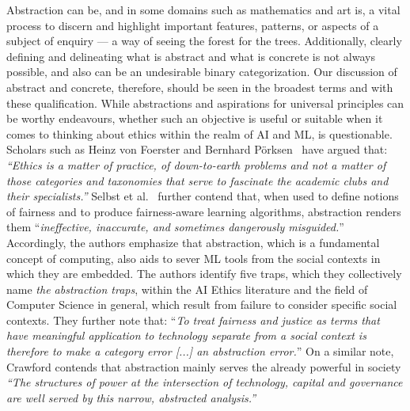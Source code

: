 \documentclass[manuscript]{acmart}
\begin{document}
Abstraction can be, and in some domains such as mathematics and art is, a vital process to discern and highlight important features, patterns, or aspects of a subject of enquiry --- a way of seeing the forest for the trees. Additionally, clearly defining and delineating what is abstract and what is concrete is not always possible, and also  can be an undesirable binary categorization. %
Our discussion of abstract and concrete, therefore, should be seen in the broadest terms and with these qualification. While abstractions and aspirations for universal principles can be worthy endeavours, whether such an objective is useful or suitable when it comes to thinking about ethics within the realm of AI and ML, is questionable. Scholars such as Heinz von Foerster and Bernhard Pörksen~\cite{von2002understanding} have argued that: \textit{``Ethics is a matter of practice, of down-to-earth problems and not a matter of those categories and taxonomies that serve to fascinate the academic clubs and their specialists.''} Selbst et al.~\cite{selbst2019fairness} further contend that, when used to define notions of fairness and to produce fairness-aware learning algorithms, abstraction renders them ``\textit{ineffective, inaccurate, and sometimes dangerously misguided.}'' Accordingly, the authors emphasize that abstraction, which is a fundamental concept of computing, also aids to sever ML tools from the social contexts in which they are embedded. The authors identify five traps, which they collectively name \textit{the abstraction traps}, within the AI Ethics literature and the field of Computer Science in general, which result from failure to consider specific social contexts. They  further note that: ``\textit{To treat fairness and justice as terms that have meaningful application to technology separate from a social context is therefore to make a category error [...] an abstraction error.}'' On a similar note, Crawford contends that abstraction mainly serves the already powerful in society \textit{``The structures of power at the intersection of technology, capital and governance are well served by this narrow, abstracted analysis.''}~\cite{crawford2021atlas} 
\end{document}
